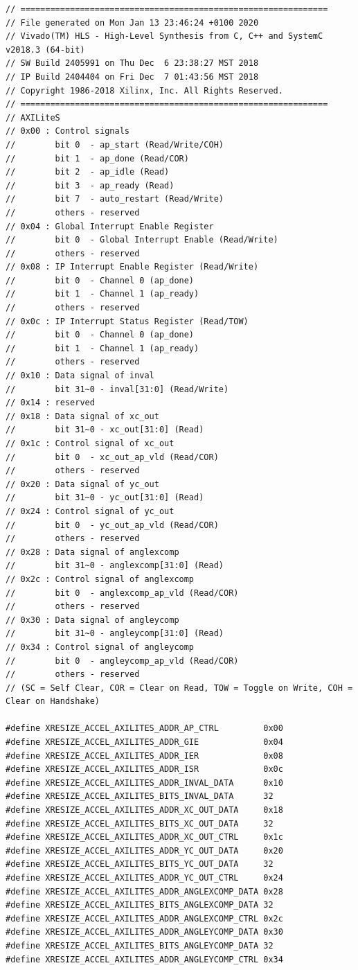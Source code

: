 \documentclass[a4paper]{report}
\begin{document}
\begin{verbatim}
// ==============================================================
// File generated on Mon Jan 13 23:46:24 +0100 2020
// Vivado(TM) HLS - High-Level Synthesis from C, C++ and SystemC v2018.3 (64-bit)
// SW Build 2405991 on Thu Dec  6 23:38:27 MST 2018
// IP Build 2404404 on Fri Dec  7 01:43:56 MST 2018
// Copyright 1986-2018 Xilinx, Inc. All Rights Reserved.
// ==============================================================
// AXILiteS
// 0x00 : Control signals
//        bit 0  - ap_start (Read/Write/COH)
//        bit 1  - ap_done (Read/COR)
//        bit 2  - ap_idle (Read)
//        bit 3  - ap_ready (Read)
//        bit 7  - auto_restart (Read/Write)
//        others - reserved
// 0x04 : Global Interrupt Enable Register
//        bit 0  - Global Interrupt Enable (Read/Write)
//        others - reserved
// 0x08 : IP Interrupt Enable Register (Read/Write)
//        bit 0  - Channel 0 (ap_done)
//        bit 1  - Channel 1 (ap_ready)
//        others - reserved
// 0x0c : IP Interrupt Status Register (Read/TOW)
//        bit 0  - Channel 0 (ap_done)
//        bit 1  - Channel 1 (ap_ready)
//        others - reserved
// 0x10 : Data signal of inval
//        bit 31~0 - inval[31:0] (Read/Write)
// 0x14 : reserved
// 0x18 : Data signal of xc_out
//        bit 31~0 - xc_out[31:0] (Read)
// 0x1c : Control signal of xc_out
//        bit 0  - xc_out_ap_vld (Read/COR)
//        others - reserved
// 0x20 : Data signal of yc_out
//        bit 31~0 - yc_out[31:0] (Read)
// 0x24 : Control signal of yc_out
//        bit 0  - yc_out_ap_vld (Read/COR)
//        others - reserved
// 0x28 : Data signal of anglexcomp
//        bit 31~0 - anglexcomp[31:0] (Read)
// 0x2c : Control signal of anglexcomp
//        bit 0  - anglexcomp_ap_vld (Read/COR)
//        others - reserved
// 0x30 : Data signal of angleycomp
//        bit 31~0 - angleycomp[31:0] (Read)
// 0x34 : Control signal of angleycomp
//        bit 0  - angleycomp_ap_vld (Read/COR)
//        others - reserved
// (SC = Self Clear, COR = Clear on Read, TOW = Toggle on Write, COH = Clear on Handshake)

#define XRESIZE_ACCEL_AXILITES_ADDR_AP_CTRL         0x00
#define XRESIZE_ACCEL_AXILITES_ADDR_GIE             0x04
#define XRESIZE_ACCEL_AXILITES_ADDR_IER             0x08
#define XRESIZE_ACCEL_AXILITES_ADDR_ISR             0x0c
#define XRESIZE_ACCEL_AXILITES_ADDR_INVAL_DATA      0x10
#define XRESIZE_ACCEL_AXILITES_BITS_INVAL_DATA      32
#define XRESIZE_ACCEL_AXILITES_ADDR_XC_OUT_DATA     0x18
#define XRESIZE_ACCEL_AXILITES_BITS_XC_OUT_DATA     32
#define XRESIZE_ACCEL_AXILITES_ADDR_XC_OUT_CTRL     0x1c
#define XRESIZE_ACCEL_AXILITES_ADDR_YC_OUT_DATA     0x20
#define XRESIZE_ACCEL_AXILITES_BITS_YC_OUT_DATA     32
#define XRESIZE_ACCEL_AXILITES_ADDR_YC_OUT_CTRL     0x24
#define XRESIZE_ACCEL_AXILITES_ADDR_ANGLEXCOMP_DATA 0x28
#define XRESIZE_ACCEL_AXILITES_BITS_ANGLEXCOMP_DATA 32
#define XRESIZE_ACCEL_AXILITES_ADDR_ANGLEXCOMP_CTRL 0x2c
#define XRESIZE_ACCEL_AXILITES_ADDR_ANGLEYCOMP_DATA 0x30
#define XRESIZE_ACCEL_AXILITES_BITS_ANGLEYCOMP_DATA 32
#define XRESIZE_ACCEL_AXILITES_ADDR_ANGLEYCOMP_CTRL 0x34
\end{verbatim}
\end{document}
